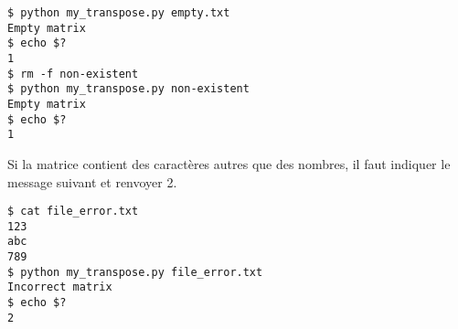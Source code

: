 \bigskip

\lstset{language=sh}
\begin{lstlisting}[frame=single,title={Cas d'erreur 1}]
$ python my_transpose.py empty.txt
Empty matrix
$ echo $?
1
$ rm -f non-existent
$ python my_transpose.py non-existent
Empty matrix
$ echo $?
1
\end{lstlisting}

\noindent Si la matrice contient des caractères autres que des nombres, il faut indiquer le message suivant et renvoyer 2.

\bigskip

\noindent {}

\bigskip

\lstset{language=sh}
\begin{lstlisting}[frame=single,title={Cas d'erreur 2}]
$ cat file_error.txt
123
abc
789
$ python my_transpose.py file_error.txt
Incorrect matrix
$ echo $?
2
\end{lstlisting}

%
